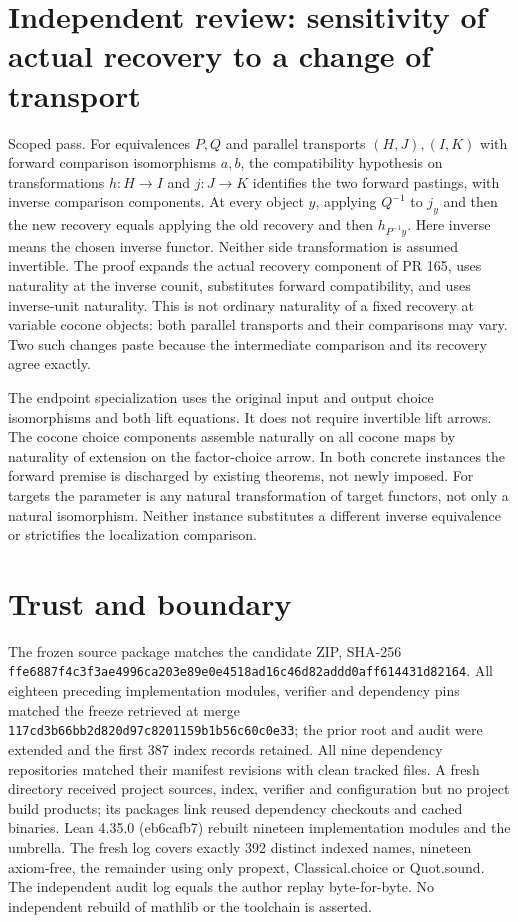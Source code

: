 \documentclass{article}
\begin{document}
\section*{Independent review: sensitivity of actual recovery to a change of transport}
Scoped pass. For equivalences $P,Q$ and parallel transports $(H,J),(I,K)$ with forward comparison isomorphisms $a,b$, the compatibility hypothesis on transformations $h:H\to I$ and $j:J\to K$ identifies the two forward pastings, with inverse comparison components. At every object $y$, applying $Q^{-1}$ to $j_y$ and then the new recovery equals applying the old recovery and then $h_{P^{-1}y}$. Here inverse means the chosen inverse functor. Neither side transformation is assumed invertible. The proof expands the actual recovery component of PR 165, uses naturality at the inverse counit, substitutes forward compatibility, and uses inverse-unit naturality. This is not ordinary naturality of a fixed recovery at variable cocone objects: both parallel transports and their comparisons may vary. Two such changes paste because the intermediate comparison and its recovery agree exactly.

The endpoint specialization uses the original input and output choice isomorphisms and both lift equations. It does not require invertible lift arrows. The cocone choice components assemble naturally on all cocone maps by naturality of extension on the factor-choice arrow. In both concrete instances the forward premise is discharged by existing theorems, not newly imposed. For targets the parameter is any natural transformation of target functors, not only a natural isomorphism. Neither instance substitutes a different inverse equivalence or strictifies the localization comparison.

\section*{Trust and boundary}
The frozen source package matches the candidate ZIP, SHA-256
\texttt{ffe6887f4c3f3ae4996ca203e89e0e4518ad16c46d82addd0aff614431d82164}.
All eighteen preceding implementation modules, verifier and dependency pins matched the freeze retrieved at merge
\texttt{117cd3b66bb2d820d97c8201159b1b56c60c0e33}; the prior root and audit were extended and the first 387 index records retained. All nine dependency repositories matched their manifest revisions with clean tracked files. A fresh directory received project sources, index, verifier and configuration but no project build products; its packages link reused dependency checkouts and cached binaries. Lean 4.35.0 (eb6cafb7) rebuilt nineteen implementation modules and the umbrella. The fresh log covers exactly 392 distinct indexed names, nineteen axiom-free, the remainder using only propext, Classical.choice or Quot.sound. The independent audit log equals the author replay byte-for-byte. No independent rebuild of mathlib or the toolchain is asserted.
\end{document}
